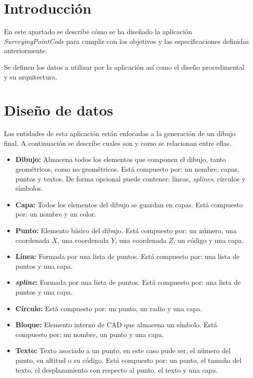
\section{Introducción}
En este apartado se describe cómo se ha diseñado la aplicación \emph{SurveyingPointCode} para cumplir con los objetivos y las especificaciones definidas anteriormente.

Se definen los datos a utilizar por la aplicación así como el diseño procedimental y su arquitectura.
\section{Diseño de datos}

Las entidades de esta aplicación están enfocadas a la generación de un dibujo final. A continuación se describe cuales son y como se relacionan entre ellas. 


\begin{itemize}

\item \textbf{Dibujo:} Almacena todos los elementos que componen el dibujo, tanto geométricos, como no geométricos. Está compuesto por: un nombre, capas, puntos y textos. De forma opcional puede contener: lineas, \emph{splines}, círculos y símbolos.

\item \textbf{Capa:} Todos los elementos del dibujo se guardan en capas. Está compuesto por: un nombre y un color.

\item \textbf{Punto:} Elemento básico del dibujo. Está compuesto por: un número, una coordenada $X$, una coordenada $Y$, una coordenada $Z$, un código y una capa.

\item \textbf{Línea:} Formada por una lista de puntos. Está compuesto por: una lista de puntos y una capa.

\item \textbf{\emph{spline}:} Formada por una lista de puntos. Está compuesto por: una lista de puntos y una capa.

\item \textbf{Círculo:} Está compuesto por: un punto, un radio y una capa.

\item \textbf{Bloque:} Elemento interno de CAD que almacena un símbolo. Está compuesto por: un nombre, un punto y una capa.

\item \textbf{Texto:} Texto asociado a un punto, en este caso pude ser, el número del punto, su altitud o su código. Está compuesto por: un punto, el tamaño del texto, el desplazamiento con respecto al punto, el texto y una capa.

\end{itemize}


